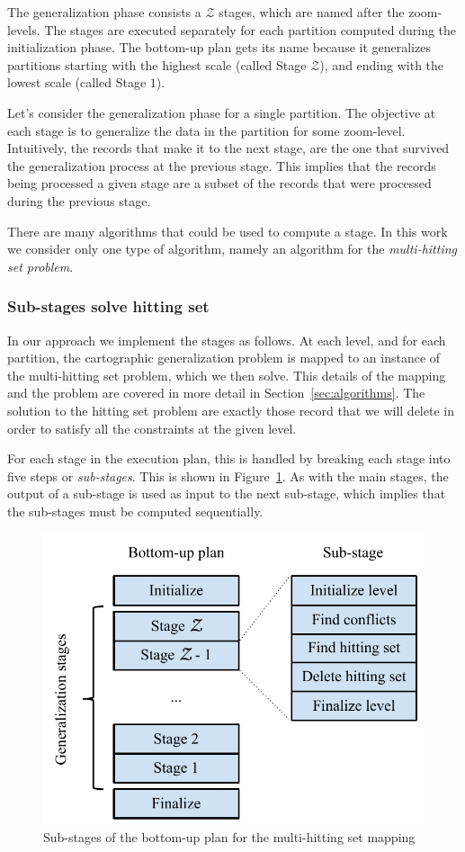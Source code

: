 The generalization phase consists a $\mathcal{Z}$ stages, which are named after the zoom-levels. The stages are executed separately for each partition computed during the initialization phase. The bottom-up plan gets its name because it generalizes partitions starting with the highest scale (called Stage $\mathcal{Z}$), and ending with the lowest scale (called Stage $1$).

Let's consider the generalization phase for a single partition. The objective at each stage is to generalize the data in the partition for some zoom-level. Intuitively, the records that make it to the next stage, are the one that survived the generalization process at the previous stage. This implies that the records being processed a given stage are a subset of the records that were processed during the previous stage.

There are many algorithms that could be used to compute a stage. In this work we consider only one type of algorithm, namely an algorithm for the \emph{multi-hitting set problem}.

\subsubsection{Sub-stages solve hitting set}
In our approach we implement the stages as follows. At each level, and for each partition, the cartographic generalization problem is mapped to an instance of the multi-hitting set problem, which we then solve. This details of the mapping and the problem are covered in more detail in Section~\ref{sec:algorithms}. The solution to the hitting set problem are exactly those record that we will delete in order to satisfy all the constraints at the given level. 

For each stage in the execution plan, this is handled by breaking each stage into five steps or \emph{sub-stages}. This is shown in Figure~\ref{fig:stages}. As with the main stages, the output of a sub-stage is used as input to the next sub-stage, which implies that the sub-stages must be computed sequentially.

\begin{figure}[htbp]
\begin{center}
\includegraphics[scale=.7]{figs/cvl_stages.pdf}
\caption{Sub-stages of the bottom-up plan for the multi-hitting set mapping}
\label{fig:stages}
\end{center}
\end{figure}
